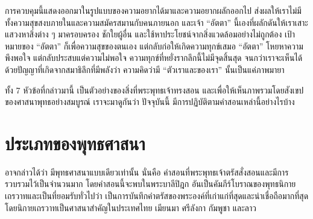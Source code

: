 \documentclass[12pt, openany]{book}
\begin{document}
การ{\wbr}ควบคุม{\wbr}นี้{\wbr}แสดงออก{\wbr}มา{\wbr}ใน{\wbr}รูปแบบ{\wbr}ของ{\wbr}ความ{\wbr}อยาก{\wbr}ได้{\wbr}มา{\wbr}และ{\wbr}ความ{\wbr}อยาก{\wbr}ผลัก{\wbr}ออก{\wbr}ไป ส่ง{\wbr}ผล{\wbr}ให้{\wbr}เรา{\wbr}ไม่{\wbr}มี{\wbr}ทั้ง{\wbr}ความ{\wbr}สุข{\wbr}สงบ{\wbr}ภายใน{\wbr}และ{\wbr}ความ{\wbr}สมัคร{\wbr}สมาน{\wbr}กับ{\wbr}คน{\wbr}ภายนอก  และ{\wbr}เจ้า “อัตตา” นี้{\wbr}เอง{\wbr}ที่{\wbr}ผลักดัน{\wbr}ให้{\wbr}เรา{\wbr}เสาะ{\wbr}แสวง{\wbr}หา{\wbr}สิ่ง{\wbr}ต่าง ๆ มา{\wbr}ครอบครอง ชักใย{\wbr}ผู้{\wbr}อื่น และ{\wbr}ใช้{\wbr}หา{\wbr}ประโยชน์{\wbr}จาก{\wbr}สิ่งแวดล้อม{\wbr}อย่าง{\wbr}ไม่{\wbr}ถูกต้อง  เป้าหมาย{\wbr}ของ “อัตตา” ก็{\wbr}เพื่อ{\wbr}ความ{\wbr}สุข{\wbr}ของ{\wbr}ตนเอง แต่{\wbr}กลับ{\wbr}ก่อ{\wbr}ให้{\wbr}เกิด{\wbr}ความ{\wbr}ทุกข์{\wbr}เสมอ  “อัตตา” โหย{\wbr}หา{\wbr}ความ{\wbr}พึงพอใจ แต่{\wbr}กลับ{\wbr}ประสบ{\wbr}แต่{\wbr}ความ{\wbr}ไม่{\wbr}พอใจ  ความ{\wbr}ทุกข์{\wbr}ที่{\wbr}หยั่ง{\wbr}ราก{\wbr}ลึก{\wbr}นี้{\wbr}ไม่{\wbr}มี{\wbr}จุด{\wbr}สิ้นสุด จน{\wbr}กว่า{\wbr}เรา{\wbr}จะ{\wbr}เห็น{\wbr}ได้{\wbr}ด้วย{\wbr}ปัญญา{\wbr}ที่{\wbr}เกิด{\wbr}จาก{\wbr}สมาธิ{\wbr}ลึก{\wbr}ที่{\wbr}มี{\wbr}พลัง{\wbr}ว่า ความคิด{\wbr}ว่า{\wbr}มี “ตัว{\wbr}เรา{\wbr}และ{\wbr}ของ{\wbr}เรา” นั้น{\wbr}เป็น{\wbr}แค่{\wbr}ภาพ{\wbr}มายา{\wbr}

ทั้ง 7 หัวข้อ{\wbr}ที่{\wbr}กล่าว{\wbr}มา{\wbr}นี้ เป็น{\wbr}ตัวอย่าง{\wbr}ของ{\wbr}สิ่ง{\wbr}ที่{\wbr}พระพุทธเจ้า{\wbr}ทรง{\wbr}สอน  และ{\wbr}เพื่อ{\wbr}ให้{\wbr}เห็น{\wbr}ภาพ{\wbr}รวม{\wbr}โดย{\wbr}สังเขป{\wbr}ของ{\wbr}ศาสนา{\wbr}พุทธ{\wbr}อย่าง{\wbr}สมบูรณ์ เรา{\wbr}จะ{\wbr}มา{\wbr}ดู{\wbr}กัน{\wbr}ว่า ปัจจุบัน{\wbr}นี้ มี{\wbr}การ{\wbr}ปฏิบัติ{\wbr}ตาม{\wbr}คำ{\wbr}สอน{\wbr}เหล่า{\wbr}นี้{\wbr}อย่างไร{\wbr}บ้าง{\wbr}

\chapter*{ประเภท{\wbr}ของ{\wbr}พุทธ{\wbr}ศาสนา}

อาจ{\wbr}กล่าว{\wbr}ได้{\wbr}ว่า มี{\wbr}พุทธ{\wbr}ศาสนา{\wbr}แบบ{\wbr}เดียว{\wbr}เท่านั้น นั่น{\wbr}คือ คำ{\wbr}สอน{\wbr}ที่{\wbr}พระพุทธเจ้า{\wbr}ตรัส{\wbr}สั่งสอน{\wbr}และ{\wbr}มี{\wbr}การ{\wbr}รวบรวม{\wbr}ไว้{\wbr}เป็น{\wbr}จำนวน{\wbr}มาก  โดย{\wbr}คำ{\wbr}สอน{\wbr}นี้{\wbr}จะ{\wbr}พบ{\wbr}ใน{\wbr}พระ{\wbr}บาลี{\wbr}ปิฎก อัน{\wbr}เป็น{\wbr}คัมภีร์{\wbr}โบราณ{\wbr}ของ{\wbr}พุทธ{\wbr}นิกาย{\wbr}เถรวาท{\wbr}และ{\wbr}เป็น{\wbr}ที่{\wbr}ยอมรับ{\wbr}ทั่วไป{\wbr}ว่า เป็น{\wbr}การ{\wbr}บันทึก{\wbr}คำ{\wbr}ตรัส{\wbr}ของ{\wbr}พระองค์{\wbr}ที่{\wbr}เก่า{\wbr}แก่{\wbr}ที่สุด{\wbr}และ{\wbr}น่า{\wbr}เชื่อถือ{\wbr}มาก{\wbr}ที่สุด โดย{\wbr}นิกาย{\wbr}เถรวาท{\wbr}เป็น{\wbr}ศาสนา{\wbr}สำคัญ{\wbr}ใน{\wbr}ประเทศ{\wbr}ไทย เมียนมา ศรีลังกา กัมพูชา และ{\wbr}ลาว  
\end{document}
